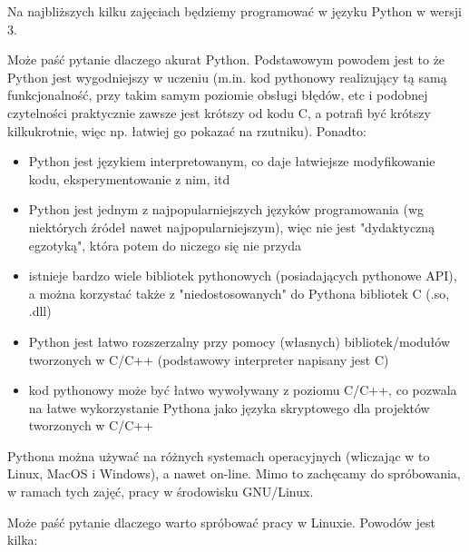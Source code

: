 \documentclass{pdfBooklets}
\begin{document}
Na najbliższych kilku zajęciach będziemy programować w języku Python w wersji 3.
\begin{teacherOnly}
Może paść pytanie dlaczego akurat Python.
Podstawowym powodem jest to że Python jest wygodniejszy w uczeniu (m.in. kod pythonowy realizujący tą samą funkcjonalność, przy takim samym poziomie obsługi błędów, etc
i podobnej czytelności praktycznie zawsze jest krótszy od kodu C, a potrafi być krótszy kilkukrotnie, więc np. łatwiej go pokazać na rzutniku).
Ponadto:
\begin{itemize}
\item Python jest językiem interpretowanym, co daje łatwiejsze modyfikowanie kodu, eksperymentowanie z nim, itd
\item Python jest jednym z najpopularniejszych języków programowania (wg niektórych źródeł nawet najpopularniejszym), więc nie jest "dydaktyczną egzotyką", która potem do niczego się nie przyda
\item istnieje bardzo wiele bibliotek pythonowych (posiadających pythonowe API), a można korzystać także z "niedostosowanych" do Pythona bibliotek C (.so, .dll)
\item Python jest łatwo rozszerzalny przy pomocy (własnych) bibliotek/modułów tworzonych w C/C++ (podstawowy interpreter napisany jest C)
\item kod pythonowy może być łatwo wywoływany z poziomu C/C++, co pozwala na łatwe wykorzystanie Pythona jako języka skryptowego dla projektów tworzonych w C/C++
\end{itemize}

\noindent
\end{teacherOnly}
%
Pythona można używać na różnych systemach operacyjnych (wliczając w to Linux, MacOS i Windows), a nawet on-line.
Mimo to zachęcamy do spróbowania, w ramach tych zajęć, pracy w środowisku GNU/Linux.
%
\begin{teacherOnly}

Może paść pytanie dlaczego warto spróbować pracy w Linuxie. Powodów jest kilka:
\end{teacherOnly}
\end{document}
